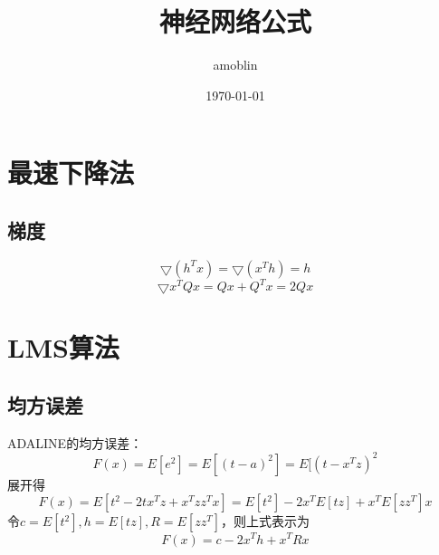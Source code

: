 \documentclass[a4paper,12pt]{article}
\title{神经网络公式}
\author{amoblin}
\date{\today}
\begin{document}
\begin{CJK*}{UTF8}{gbsn}
\maketitle
\section{最速下降法}
\subsection{梯度}
\begin{equation}
\bigtriangledown(h^Tx) = \bigtriangledown(x^Th) = h
\end{equation}
\begin{equation}
\bigtriangledown x^TQx = Qx + Q^Tx = 2Qx
\end{equation}
\section{LMS算法}
\subsection{均方误差}
ADALINE的均方误差：
\begin{equation}
F(x)= E[e^2] = E[(t-a)^2] = E[(t-x^Tz)^2
\end{equation}
展开得
\begin{equation}
F(x) = E[t^2 - 2tx^Tz + x^Tzz^Tx]
= E[t^2] - 2x^TE[tz] + x^TE[zz^T]x
\end{equation}
令$ c = E[t^2], h = E[tz], R = E[zz^T] $，则上式表示为
\begin{equation}
F(x) = c - 2x^Th + x^TRx
\end{equation}
\end{CJK*}
\end{document}
